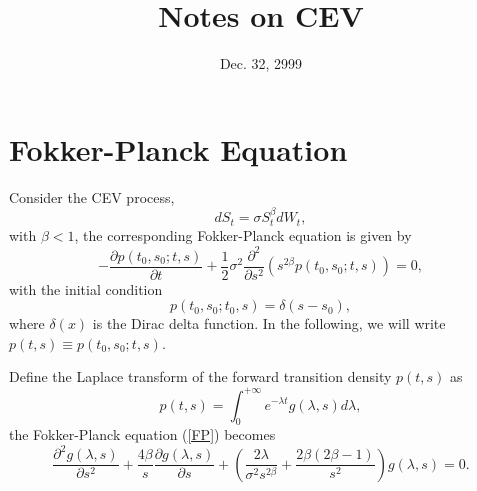 \documentclass[12pt]{article}
\begin{document}
\title{Notes on CEV}
\date{Dec. 32, 2999}

\maketitle

\section{Fokker-Planck Equation}

  Consider the CEV process,
  \begin{equation}
    dS_t=\sigma S_t^{\beta}dW_t,
    \label{CEV}
  \end{equation}
  with $\beta < 1$, the corresponding Fokker-Planck equation is given by
  \begin{equation}
    -\frac{\partial p(t_0,s_0;t,s)}{\partial t}+\frac{1}{2}\sigma^2\frac{\partial^2}{\partial s^2}
    \left(s^{2\beta}p(t_0,s_0;t,s)\right) = 0,
    \label{FP}
  \end{equation}
  with the initial condition
  \begin{equation}
    p(t_0,s_0;t_0,s) = \delta(s-s_0),
    \label{initial}
  \end{equation}
  where $\delta(x)$ is the Dirac delta function. In the following, we will write $p(t,s)\equiv p(t_0,s_0;t,s)$.

  Define the Laplace transform of the forward transition density $p(t,s)$ as
  \begin{equation}
    p(t,s)=\int_0^{+\infty}e^{-\lambda t}g(\lambda, s)d\lambda,
    \label{Laplace}
  \end{equation}
  the Fokker-Planck equation (\ref{FP}) becomes
  \begin{equation}
    \frac{\partial^2g(\lambda,s)}{\partial s^2}+\frac{4\beta}{s}\frac{\partial g(\lambda,s)}{\partial s}
    + \left(\frac{2\lambda}{\sigma^2 s^{2\beta}}+\frac{2\beta(2\beta-1)}{s^2}\right)g(\lambda, s) = 0.
    \label{FP2}
  \end{equation}
\end{document}

